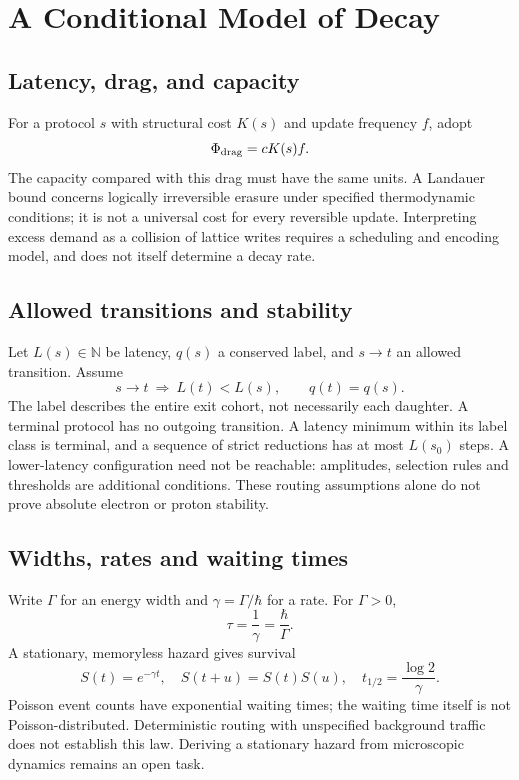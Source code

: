 \section{A Conditional Model of Decay}
\label{sec:decay_model}
\subsection{Latency, drag, and capacity}
For a protocol $s$ with structural cost $K(s)$ and update frequency $f$, adopt
\begin{equation}
\Phi_{\rm drag}=c K(s)f.
\end{equation}
The capacity compared with this drag must have the same units. A Landauer bound concerns logically irreversible erasure under specified thermodynamic conditions; it is not a universal cost for every reversible update. Interpreting excess demand as a collision of lattice writes requires a scheduling and encoding model, and does not itself determine a decay rate.

\subsection{Allowed transitions and stability}
Let $L(s)\in\mathbb N$ be latency, $q(s)$ a conserved label, and $s\to t$ an allowed transition. Assume
\begin{equation}
s\to t\ \Longrightarrow\ L(t)<L(s),\qquad q(t)=q(s).
\end{equation}
The label describes the entire exit cohort, not necessarily each daughter. A terminal protocol has no outgoing transition. A latency minimum within its label class is terminal, and a sequence of strict reductions has at most $L(s_0)$ steps. A lower-latency configuration need not be reachable: amplitudes, selection rules and thresholds are additional conditions. These routing assumptions alone do not prove absolute electron or proton stability.

\subsection{Widths, rates and waiting times}
Write $\Gamma$ for an energy width and $\gamma=\Gamma/\hbar$ for a rate. For $\Gamma>0$,
\begin{equation}
\tau=\frac{1}{\gamma}=\frac{\hbar}{\Gamma}.
\end{equation}
A stationary, memoryless hazard gives survival
\begin{equation}
S(t)=e^{-\gamma t},\quad S(t+u)=S(t)S(u),\quad
 t_{1/2}=\frac{\log 2}{\gamma}.
\end{equation}
Poisson event counts have exponential waiting times; the waiting time itself is not Poisson-distributed. Deterministic routing with unspecified background traffic does not establish this law. Deriving a stationary hazard from microscopic dynamics remains an open task.
